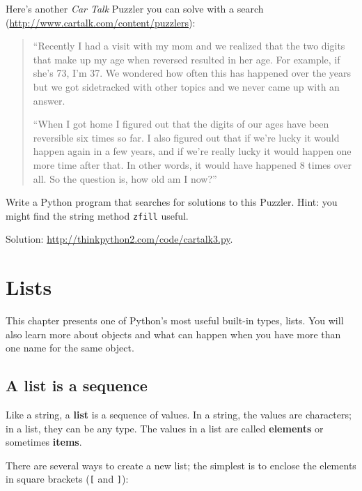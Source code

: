 \documentclass[10pt]{book}
\begin{document}
\begin{exercise}
Here's another {\em Car Talk} Puzzler you can solve with a
search (\url{http://www.cartalk.com/content/puzzlers}):

\begin{quote}
``Recently I had a visit with my mom and we realized that
the two digits that make up my age when reversed resulted in her
age. For example, if she's 73, I'm 37. We wondered how often this has
happened over the years but we got sidetracked with other topics and
we never came up with an answer.

``When I got home I figured out that the digits of our ages have been
reversible six times so far. I also figured out that if we're lucky it
would happen again in a few years, and if we're really lucky it would
happen one more time after that. In other words, it would have
happened 8 times over all. So the question is, how old am I now?''

\end{quote}

Write a Python program that searches for solutions to this Puzzler.
Hint: you might find the string method {\tt zfill} useful.

Solution: \url{http://thinkpython2.com/code/cartalk3.py}.

\end{exercise}



\chapter{Lists}

This chapter presents one of Python's most useful built-in types, lists.
You will also learn more about objects and what can happen when you have
more than one name for the same object.


\section{A list is a sequence}
\label{sequence}

Like a string, a {\bf list} is a sequence of values.  In a string, the
values are characters; in a list, they can be any type.  The values in
a list are called {\bf elements} or sometimes {\bf items}.

There are several ways to create a new list; the simplest is to
enclose the elements in square brackets (\verb"[" and \verb"]"):
\end{document}
